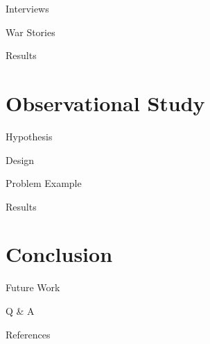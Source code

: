\documentclass[aspectratio=169]{beamer}
\begin{document}
\begin{frame}{Interviews}

\end{frame}

\note[itemize] {
	\item
}


\begin{frame}{War Stories}

\end{frame}

\note[itemize] {
	\item
}


\begin{frame}{Results}

\end{frame}

\note[itemize] {
	\item
}

\section{Observational Study}
\begin{frame}{Hypothesis}

\end{frame}

\note[itemize] {
	\item
}


\begin{frame}{Design}

\end{frame}

\note[itemize] {
	\item
}


\begin{frame}{Problem Example}

\end{frame}

\note[itemize] {
	\item
}


\begin{frame}{Results}

\end{frame}

\note[itemize] {
	\item
}

\section{Conclusion}
\begin{frame}{}

\end{frame}

\note[itemize] {
	\item
}


\begin{frame}{Future Work}

\end{frame}

\note[itemize] {
	\item
}


\begin{frame}
	Q \& A
\end{frame}

\appendix
\begin{frame}[allowframebreaks]{References}
	
	
\end{frame}
\end{document}
